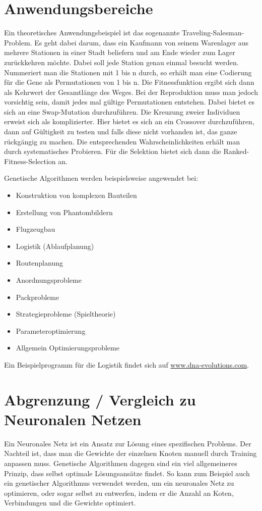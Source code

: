 \section{Anwendungsbereiche}
Ein theoretisches Anwendungsbeispiel ist das sogenannte Traveling-Salesman-Problem. Es geht dabei darum, dass ein Kaufmann von seinem Warenlager aus mehrere Stationen in einer Stadt beliefern und am Ende wieder zum Lager zurückkehren möchte. Dabei soll jede Station genau einmal besucht werden. Nummeriert man die Stationen mit 1 bis n durch, so erhält man eine Codierung für die Gene als Permutationen von 1 bis n. Die Fitnessfunktion ergibt sich dann als Kehrwert der Gesamtlänge des Weges. Bei der Reproduktion muss man jedoch vorsichtig sein, damit jedes mal gültige Permutationen entstehen. Dabei bietet es sich an eine Swap-Mutation durchzuführen. Die Kreuzung zweier Individuen erweist sich als komplizierter. Hier bietet es sich an ein Crossover durchzuführen, dann auf Gültigkeit zu testen und falls diese nicht vorhanden ist, das ganze rückgängig zu machen. Die entsprechenden Wahrscheinlichkeiten erhält man durch systematisches Probieren. Für die Selektion bietet sich dann die Ranked-Fitness-Selection an.

Genetische Algorithmen werden beispielsweise angewendet bei:
\begin{itemize}
	\item Konstruktion von komplexen Bauteilen
	\item Erstellung von Phantombildern
	\item Flugzeugbau
	\item Logistik (Ablaufplanung)
	\item Routenplanung
	\item Anordnungsprobleme
	\item Packprobleme
	\item Strategieprobleme (Spieltheorie)
	\item Parameteroptimierung
	\item Allgemein Optimierungsprobleme
\end{itemize}

Ein Beispielprogramm für die Logistik findet sich auf \href{http://www.dna-evolutions.com}{www.dna-evolutions.com}.

\section{Abgrenzung / Vergleich zu Neuronalen Netzen}
Ein Neuronales Netz ist ein Ansatz zur Lösung eines spezifischen Problems. Der Nachteil ist, dass man die Gewichte der einzelnen Knoten manuell durch Training anpassen muss. Genetische Algorithmen dagegen sind ein viel allgemeineres Prinzip, dass selbst optimale Lösungsansätze findet. So kann zum Beispiel auch ein genetischer Algorithmus verwendet werden, um ein neuronales Netz zu optimieren, oder sogar selbst zu entwerfen, indem er die Anzahl an Koten, Verbindungen und die Gewichte optimiert.\\

